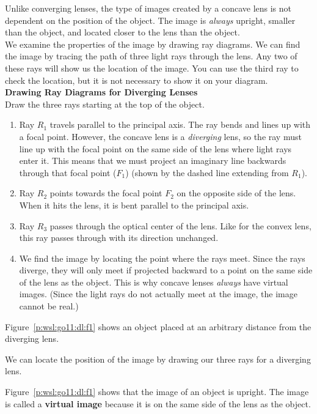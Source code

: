 Unlike converging lenses, the type of images created by a concave lens is not dependent on the position of the object. The image is \textit{always} upright, smaller than the object, and located closer to the lens than the object.\\

We examine the properties of the image by drawing ray diagrams. We can find the image by tracing the path of three light rays through the lens. Any two of these rays will show us the location of the image. You can use the third ray to check the location, but it is not necessary to show it on your diagram.\\

\newpage
\textbf{Drawing Ray Diagrams for Diverging Lenses}\\
Draw the three rays starting at the top of the object.
\begin{enumerate}
\item Ray $R_{1}$ travels parallel to the principal axis. The ray bends and lines up with a focal point. However, the concave lens is a \textit{diverging} lens, so the ray must line up with the focal point on the same side of the lens where light rays enter it. This means that we must project an imaginary line backwards through that focal point ($F_{1}$) (shown by the dashed line extending from $R_{1}$).
\item Ray $R_{2}$ points towards the focal point $F_{2}$ on the opposite side of the lens. When it hits the lens, it is bent parallel to the principal axis.
\item Ray $R_{3}$ passes through the optical center of the lens. Like for the convex lens, this ray passes through with its direction unchanged.
\item We find the image by locating the point where the rays meet. Since the rays diverge, they will only meet if projected backward to a point on the same side of the lens as the object. This is why concave lenses \textit{always} have virtual images. (Since the light rays do not actually meet at the image, the image cannot be real.)
\end{enumerate}

Figure~\ref{p:wsl:go11:dl:f1} shows an object placed at an arbitrary distance from the diverging lens.

We can locate the position of the image by drawing our three rays for a diverging lens. 

Figure~\ref{p:wsl:go11:dl:f1} shows that the image of an object is upright. The image is called a \textbf{virtual image} because it is on the same side of the lens as the object.

